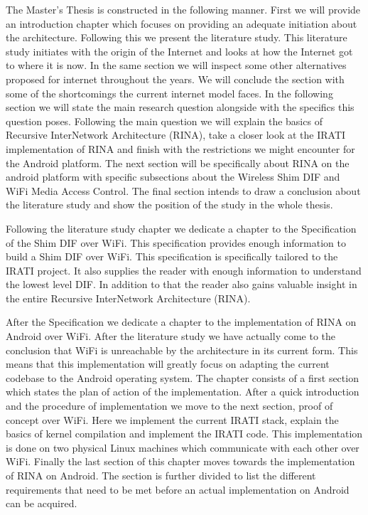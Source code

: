\begin{slshape}
\npar

The Master's Thesis is constructed in the following manner. First we will provide an introduction chapter which focuses on providing an adequate initiation about the architecture. Following this we present the literature study. This literature study initiates with the origin of the Internet and looks at how the Internet got to where it is now. In the same section we will inspect some other alternatives proposed for internet throughout the years. We will conclude the section with some of the shortcomings the current internet model faces. In the following section we will state the main research question alongside with the specifics this question poses. Following the main question we will explain the basics of Recursive InterNetwork Architecture (RINA), take a closer look at the IRATI implementation of RINA and finish with the restrictions we might encounter for the Android platform. The next section will be specifically about RINA on the android platform with specific subsections about the Wireless Shim DIF and WiFi Media Access Control. The final section intends to draw a conclusion about the literature study and show the position of the study in the whole thesis.

\npar

Following the literature study chapter we dedicate a chapter to the Specification of the Shim DIF over WiFi. This specification provides enough information to build a Shim DIF over WiFi. This specification is specifically tailored to the IRATI project. It also supplies the reader with enough information to understand the lowest level DIF. In addition to that the reader also gains valuable insight in the entire Recursive InterNetwork Architecture (RINA). 

\npar

After the Specification we dedicate a chapter to the implementation of RINA on Android over WiFi. After the literature study we have actually come to the conclusion that WiFi is unreachable by the architecture in its current form. This means that this implementation will greatly focus on adapting the current codebase to the Android operating system. The chapter consists of a first section which states the plan of action of the implementation. After a quick introduction and the procedure of implementation we move to the next section, proof of concept over WiFi. Here we implement the current IRATI stack, explain the basics of kernel compilation and implement the IRATI code. This implementation is done on two physical Linux machines which communicate with each other over WiFi. Finally the last section of this chapter moves towards the implementation of RINA on Android. The section is further divided to list the different requirements that need to be met before an actual implementation on Android can be acquired. 


\end{slshape}
